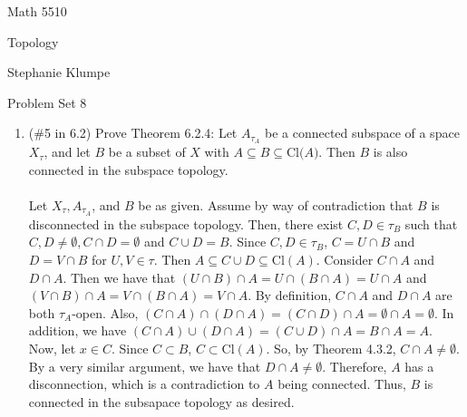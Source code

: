 \documentclass[12pt]{article}
\begin{document}
\noindent Math 5510

\noindent Topology

\noindent Stephanie Klumpe

\vspace{.2in}
\begin{center}
Problem Set 8
\end{center}

 \begin{enumerate}%
  \item(\#5 in 6.2) Prove Theorem 6.2.4: Let $A_{\tau_A}$ be a connected subspace of a space $X_{\tau}$, and let $B$ be a subset of $X$ with $A\subseteq B\subseteq \text{Cl($A$)}$. Then $B$ is also connected in the subspace topology.\\\\
Let $X_{\tau}, A_{\tau_A}$, and $B$ be as given. Assume by way of contradiction that $B$ is disconnected in the subspace topology. Then, there exist $C,D\in\tau_{B}$ such that $C,D\neq\emptyset, C\cap D=\emptyset$ and $C\cup D=B$. Since $C,D\in\tau_{B}$, $C=U\cap B$ and $D=V\cap B$ for $U,V\in\tau$. Then $A\subseteq C\cup D\subseteq$Cl$(A)$. Consider $C\cap A$ and $D\cap A$. Then we have that $(U\cap B)\cap A=U\cap(B\cap A)=U\cap A$ and $(V\cap B)\cap A=V\cap(B\cap A)=V\cap A$. By definition, $C\cap A$ and $D\cap A$ are both $\tau_A$-open. Also, $(C\cap A)\cap(D\cap A)=(C\cap D)\cap A=\emptyset\cap A=\emptyset$. In addition, we have $(C\cap A)\cup(D\cap A)=(C\cup D)\cap A=B\cap A=A$. Now, let $x\in C$. Since $C\subset B$, $C\subset$Cl$(A)$. So, by Theorem 4.3.2, $C\cap A\neq\emptyset$. By a very similar argument, we have that $D\cap A\neq\emptyset$. Therefore, $A$ has a disconnection, which is a contradiction to $A$ being connected. Thus, $B$ is connected in the subsapace topology as desired.\\


\end{enumerate}
\end{document}
